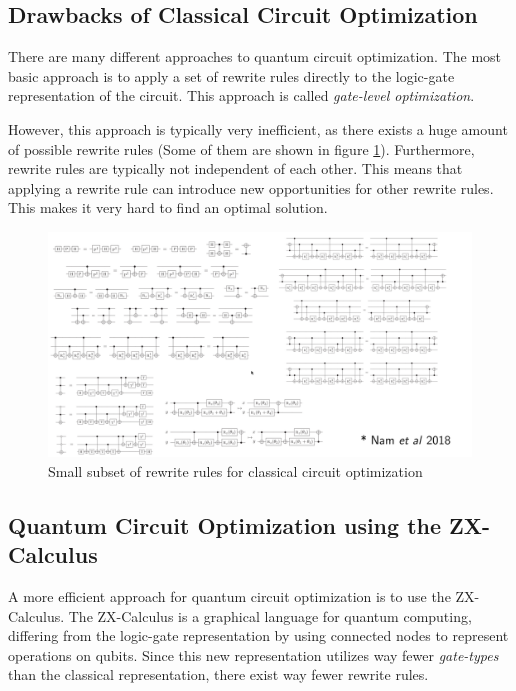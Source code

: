 \subsection{Drawbacks of Classical Circuit Optimization}

There are many different approaches to quantum circuit optimization. The most basic approach is to apply a set of rewrite rules directly to the logic-gate representation of the circuit. This approach is called \textit{gate-level optimization}. \cite{namyross2018automated}

However, this approach is typically very inefficient, as there exists a huge amount of possible rewrite rules (Some of them are shown in figure \ref{fig:rewrite_rules_classical}). Furthermore, rewrite rules are typically not independent of each other. This means that applying a rewrite rule can introduce new opportunities for other rewrite rules. This makes it very hard to find an optimal solution. \cite{alexkissinger2020introductionzx}

\begin{figure}[h]
    \centering
    \includegraphics[width=\linewidth]{images/rewrite_rules_classical.png}
    \caption{Small subset of rewrite rules for classical circuit optimization
            {\cite{alexkissinger2020introductionzx}}}
    \label{fig:rewrite_rules_classical}
\end{figure}


\subsection{Quantum Circuit Optimization using the ZX-Calculus}

A more efficient approach for quantum circuit optimization is to use the ZX-Calculus. The ZX-Calculus is a graphical language for quantum computing, differing from the logic-gate representation by using connected nodes to represent operations on qubits. Since this new representation utilizes way fewer \textit{gate-types} than the classical representation, there exist way fewer rewrite rules.